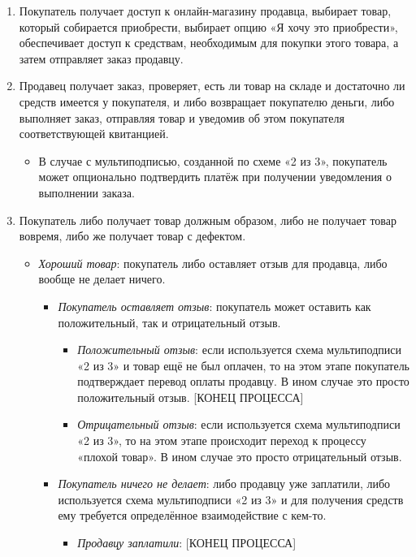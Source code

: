 \begin{enumerate}
    \item Покупатель получает доступ к онлайн-магазину продавца, выбирает товар, который собирается приобрести, выбирает опцию «Я хочу это приобрести», обеспечивает доступ к средствам, необходимым для покупки этого товара, а затем отправляет заказ продавцу.
    \item Продавец получает заказ, проверяет, есть ли товар на складе и достаточно ли средств имеется у покупателя, и либо возвращает покупателю деньги, либо выполняет заказ, отправляя товар и уведомив об этом покупателя соответствующей квитанцией.
    \begin{itemize}
        \item В случае с мультиподписью, созданной по схеме «2 из 3», покупатель может опцио\-нально подтвердить платёж при получении уведомления о выполнении заказа.
    \end{itemize}{}
    \item Покупатель либо получает товар должным образом, либо не получает товар вовремя, либо же получает товар с дефектом.
    \begin{itemize}
        \item {\em Хороший товар}: покупатель либо оставляет отзыв для продавца, либо вообще не делает ничего.
        \begin{itemize}
            \item {\em Покупатель оставляет отзыв}: покупатель может оставить как положитель\-ный, так и отрицательный отзыв.
            \begin{itemize}
                \item {\em Положительный отзыв}: если используется схема мультиподписи «2 из 3» и товар ещё не был оплачен, то на этом этапе покупатель подтверждает перевод оплаты продавцу. В ином случае это просто положительный отзыв. [КОНЕЦ ПРОЦЕССА]
                \item {\em Отрицательный отзыв}: если используется схема мультиподписи «2 из 3», то на этом этапе происходит переход к процессу «плохой товар». В ином случае это просто отрицательный отзыв.
            \end{itemize}{}
            \item {\em Покупатель ничего не делает}: либо продавцу уже заплатили, либо использует\-ся схема мультиподписи «2 из 3» и для получения средств ему требуется опре\-делённое взаимодействие с кем-то.
            \begin{itemize}
                \item {\em Продавцу заплатили}: [КОНЕЦ ПРОЦЕССА]

\end{itemize}
\end{itemize}
\end{itemize}
\end{enumerate}
